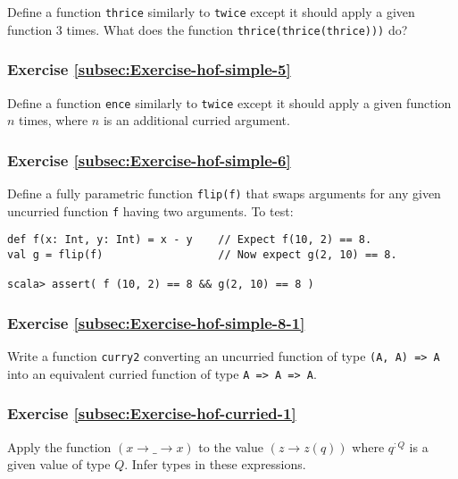 Define a function \lstinline!thrice! similarly to \lstinline!twice!
except it should apply a given function $3$ times. What does the
function \lstinline!thrice(thrice(thrice)))! do?

\subsubsection{Exercise \label{subsec:Exercise-hof-simple-5}\ref{subsec:Exercise-hof-simple-5}}

Define a function \lstinline!ence! similarly to \lstinline!twice!
except it should apply a given function $n$ times, where $n$ is
an additional curried argument.

\subsubsection{Exercise \label{subsec:Exercise-hof-simple-6}\ref{subsec:Exercise-hof-simple-6}}

Define a fully parametric function \lstinline!flip(f)! that swaps
arguments for any given uncurried function \lstinline!f! having two
arguments. To test: 

\begin{lstlisting}
def f(x: Int, y: Int) = x - y    // Expect f(10, 2) == 8.
val g = flip(f)                  // Now expect g(2, 10) == 8.

scala> assert( f (10, 2) == 8 && g(2, 10) == 8 )
\end{lstlisting}


\subsubsection{Exercise \label{subsec:Exercise-hof-simple-8-1}\ref{subsec:Exercise-hof-simple-8-1}}

Write a function \lstinline!curry2! converting an uncurried function
of type \texttt{}\lstinline!(A, A) => A! into an equivalent curried
function of type \texttt{}\lstinline!A => A => A!.

\subsubsection{Exercise \label{subsec:Exercise-hof-curried-1}\ref{subsec:Exercise-hof-curried-1}}

Apply the function $\left(x\rightarrow\_\rightarrow x\right)$ to
the value $\left(z\rightarrow z(q)\right)$ where $q^{:Q}$ is a given
value of type $Q$. Infer types in these expressions.


